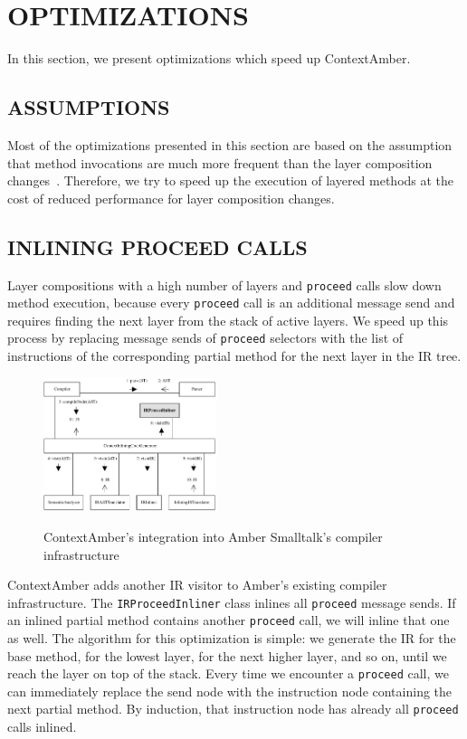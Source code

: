\documentclass[english,paper=a4,twocolumn=true,DIV=calc,fontsize=9pt]{scrartcl}
\begin{document}
\section{OPTIMIZATIONS}
In this section, we present optimizations which speed up ContextAmber.

\subsection{ASSUMPTIONS}
Most of the optimizations presented in this section are based on the assumption that method invocations are much more frequent than the layer composition changes~\cite{10.1109/C5.2012.20}. Therefore, we try to speed up the execution of layered methods at the cost of reduced performance for layer composition changes.

\subsection{INLINING PROCEED CALLS}
Layer compositions with a high number of layers and \texttt{proceed} calls slow down method execution, because every \texttt{proceed} call is an additional message send and requires finding the next layer from the stack of active layers. We speed up this process by replacing message sends of \texttt{proceed} selectors with the list of instructions of the corresponding partial method for the next layer in the IR tree.

\begin{figure}[!htp]
    \centering
    \includegraphics[width=0.45\textwidth]{compiler_inline.pdf}
    \label{fig:comp-inline}
    \caption{ContextAmber's integration into Amber Smalltalk's compiler infrastructure}
\end{figure}

ContextAmber adds another IR visitor to Amber's existing compiler infrastructure. The \texttt{IRProceedInliner} class inlines all \texttt{proceed} message sends. If an inlined partial method contains another \texttt{proceed} call, we will inline that one as well. The algorithm for this optimization is simple: we generate the IR for the base method, for the lowest layer, for the next higher layer, and so on, until we reach the layer on top of the stack. Every time we encounter a \texttt{proceed} call, we can immediately replace the send node with the instruction node containing the next partial method. By induction, that instruction node has already all \texttt{proceed} calls inlined.
\end{document}
